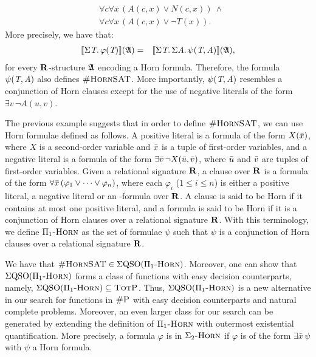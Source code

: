 \begin{example}
\begin{align*}
&\forall c \forall x \, (\textit{A}(c,x) \vee \textit{N}(c,x)) \ \wedge\\
&\forall c \forall x \, (\textit{A}(c,x) \vee \neg\textit{T}(x)).
\end{align*}
More precisely, we have that:
\begin{eqnarray*}
{\llbracket{}{\Sigma{\textit{T}}.\, \varphi(\textit{T})}\rrbracket}(\mathfrak{A}) &=& {\llbracket{}{\Sigma{\textit{T}}.\, \Sigma{\textit{A}}.\, \psi(\textit{T},\textit{A})}\rrbracket}(\mathfrak{A}),
\end{eqnarray*}
 for every $\mathbf{R}$-structure $\mathfrak{A}$ encoding a Horn formula. Therefore, the formula $\psi(\textit{T},\textit{A})$ also defines $\textsc{\#HornSAT}$. More importantly, $\psi(\textit{T},\textit{A})$ resembles a conjunction of Horn clauses except for the use of negative literals of the form $\exists v \, \neg \textit{A}(u,v)$. 
\end{example}
The previous example suggests that in order to define $\textsc{\#HornSAT}$, we can use Horn formulae defined as follows. 
A positive literal is a formula of the form $X(\bar{x})$, where $X$ is a second-order variable and $\bar{x}$ is a tuple of first-order variables, and a negative literal is a formula of the form $\exists \bar{v} \, \neg X(\bar{u},\bar{v})$, where $\bar{u}$ and $\bar{v}$ are tuples of first-order variables. Given a relational signature $\mathbf{R}$, a clause over $\mathbf{R}$ is a formula of the form $\forall \bar{x} \, (\varphi_1 \vee \cdots \vee \varphi_n)$, 
where each $\varphi_i$ ($1 \leq i \leq n$) is either a positive literal, a negative literal or an \fo-formula over $\mathbf{R}$.  A clause is said to be Horn if it contains at most one positive literal, and a formula is said to be Horn if it is a conjunction of Horn clauses over a relational signature $\mathbf{R}$. With this terminology, we define $\Pi_1\textsc{-Horn}$ as the set of formulae $\psi$ such that $\psi$ is a conjunction of Horn clauses over a relational signature $\mathbf{R}$. 

We have that $\textsc{\#HornSAT} \in \Sigma{\rm QSO}(\Pi_1\textsc{-Horn})$. Moreover, one can show that $\Sigma{\rm QSO}(\Pi_1\textsc{-Horn})$ forms a class of functions with easy decision counterparts, namely, $\Sigma{\rm QSO}(\Pi_1\textsc{-Horn}) \subseteq \text{\sc TotP}$.
Thus, $\Sigma{\rm QSO}(\Pi_1\textsc{-Horn})$ is a new alternative in our search for functions in $\text{\sc \#P}$ with easy decision counterparts and natural complete problems. Moreover, an even larger class for our search can be generated by extending the definition of $\Pi_1\textsc{-Horn}$ with outermost existential quantification. More precisely, a formula $\varphi$ is in $\Sigma_2\textsc{-Horn}$ if $\varphi$ is of the form $\exists \bar x \, \psi$ with $\psi$ a Horn formula. 


